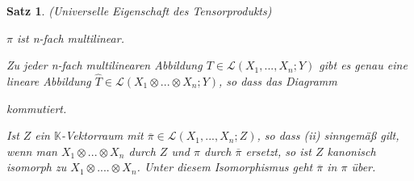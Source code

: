 \documentclass[12pt,a4paper]{article}
\newtheorem{theorem}{Satz}
\theoremstyle{definition}
\theoremstyle{remark}
\renewcommand{\bar}[1]{\overline{#1}}
\renewcommand{\hat}[1]{\widehat{#1}}
\begin{document}
	\begin{theorem}{(Universelle Eigenschaft des Tensorprodukts)}
		\begin{proofenum}
			\item 	
				$\pi$ ist n-fach multilinear. 
			\item
				Zu jeder n-fach multilinearen Abbildung $T \in \mathcal{L}(X_1,...,X_n;Y)$ gibt es genau eine lineare Abbildung $\hat{T} \in \mathcal{L}(X_1 \otimes ... \otimes X_n;Y)$, so dass das Diagramm
				\begin{center}
				\end{center}
				kommutiert.
			\item 
				Ist $Z$ ein $\mathbb{K}$-Vektorraum mit $\bar{\pi} \in \mathcal{L}(X_1,...,X_n;Z)$, so dass (ii) sinngemäß gilt, wenn man $X_1 \otimes ... \otimes X_n$ durch $Z$ und $\pi$ durch $\bar{\pi}$ ersetzt, so ist $Z$ kanonisch isomorph zu $X_1 \otimes .... \otimes X_n$. Unter diesem Isomorphismus geht $\bar{\pi}$ in $\pi$ über.
		\end{proofenum}
	\end{theorem}
\end{document}
